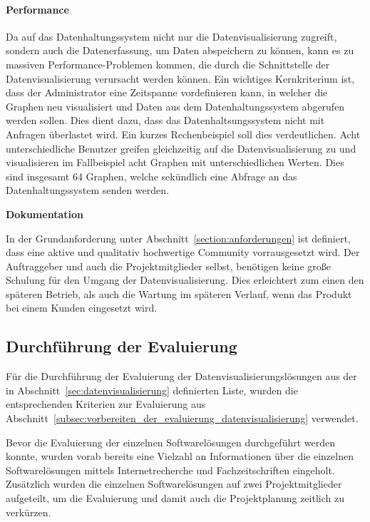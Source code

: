\paragraph{Performance}
\begin{outline}
  \1 Da auf das Datenhaltungssystem nicht nur die Datenvisualisierung zugreift,
  sondern auch die Datenerfassung, um Daten abspeichern zu können, kann es zu
  massiven Performance\hyp{}Problemen kommen, die durch die Schnittstelle der
  Datenvisualisierung verursacht werden können. Ein wichtiges Kernkriterium
  ist, dass der Administrator eine Zeitspanne vordefinieren kann, in welcher
  die Graphen neu visualisiert und Daten aus dem Datenhaltungssystem abgerufen
  werden sollen. Dies dient dazu, dass das Datenhaltsungssystem nicht mit
  Anfragen überlastet wird. Ein kurzes Rechenbeispiel soll dies verdeutlichen.
  Acht unterschiedliche Benutzer greifen gleichzeitig auf die
  Datenvisualisierung zu und visualisieren im Fallbeispiel acht Graphen mit
  unterschiedlichen Werten. Dies sind insgesamt 64 Graphen, welche sekündlich
  eine Abfrage an das Datenhaltungssystem senden werden.
\end{outline}

\textbf{Dokumentation}
\begin{outline}
  \1  In der Grundanforderung unter Abschnitt~\ref{section:anforderungen} ist
  definiert, dass eine aktive und qualitativ hochwertige Community
  vorrausgesetzt wird. Der Auftraggeber und auch die Projektmitglieder selbst,
  benötigen keine große Schulung für den Umgang der Datenvisualisierung. Dies
  erleichtert zum einen den späteren Betrieb, als auch die Wartung im späteren
  Verlauf, wenn das Produkt bei einem Kunden eingesetzt wird.
\end{outline}
\mr%

\subsection{Durchführung der Evaluierung}
\label{subsec:durchfuehrung_evaluierung_datenvisualisierung}
Für die Durchführung der Evaluierung der Datenvisualisierungslösungen aus der
in Abschnitt~\ref{sec:datenvisualisierung} definierten Liste, wurden die
entsprechenden Kriterien zur Evaluierung aus
Abschnitt~\ref{subsec:vorbereiten_der_evaluierung_datenvisualisierung}
verwendet.

Bevor die Evaluierung der einzelnen Softwarelösungen durchgeführt werden
konnte, wurden vorab bereits eine Vielzahl an Informationen über die einzelnen
Softwarelösungen mittels Internetrecherche und Fachzeitschriften eingeholt.
Zusätzlich wurden die einzelnen Softwarelösungen auf zwei Projektmitglieder
aufgeteilt, um die Evaluierung und damit auch die Projektplanung zeitlich zu
verkürzen.

